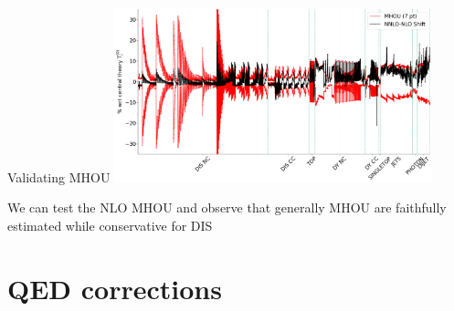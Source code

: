 \documentclass[aspectratio=169, 8pt,t]{beamer}
\begin{document}
\begin{frame}{Validating MHOU}
  \includegraphics[width=0.69\textwidth]{figures/shift_validation.png}

  We can test the NLO MHOU and observe that generally MHOU are faithfully estimated while conservative for DIS
\end{frame}



\section*{QED corrections}
\end{document}
